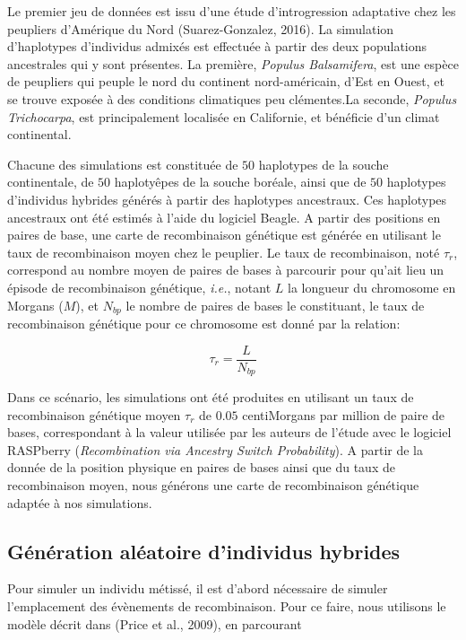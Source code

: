 \documentclass[12pt,twoside]{ugathesis}
\begin{document}
  Le premier jeu de données est issu d'une étude d'introgression
  adaptative chez les peupliers d'Amérique du Nord (Suarez-Gonzalez,
  2016). La simulation d'haplotypes d'individus admixés est effectuée à
  partir des deux populations ancestrales qui y sont présentes. La
  première, \emph{Populus Balsamifera}, est une espèce de peupliers qui
  peuple le nord du continent nord-américain, d'Est en Ouest, et se trouve
  exposée à des conditions climatiques peu clémentes.La seconde,
  \emph{Populus Trichocarpa}, est principalement localisée en Californie,
  et bénéficie d'un climat continental.
  
  Chacune des simulations est constituée de \(50\) haplotypes de la souche
  continentale, de \(50\) haplotyêpes de la souche boréale, ainsi que de
  \(50\) haplotypes d'individus hybrides générés à partir des haplotypes
  ancestraux. Ces haplotypes ancestraux ont été estimés à l'aide du
  logiciel Beagle. A partir des positions en paires de base, une carte de
  recombinaison génétique est générée en utilisant le taux de
  recombinaison moyen chez le peuplier. Le taux de recombinaison, noté
  \(\tau_r\), correspond au nombre moyen de paires de bases à parcourir
  pour qu'ait lieu un épisode de recombinaison génétique, \emph{i.e.},
  notant \(L\) la longueur du chromosome en Morgans (\(M\)), et \(N_{bp}\)
  le nombre de paires de bases le constituant, le taux de recombinaison
  génétique pour ce chromosome est donné par la relation:
  
  \[\tau_r = \frac{L}{N_{bp}}\]
  
  Dans ce scénario, les simulations ont été produites en utilisant un taux
  de recombinaison génétique moyen \(\tau_r\) de \(0.05\) centiMorgans par
  million de paire de bases, correspondant à la valeur utilisée par les
  auteurs de l'étude avec le logiciel RASPberry
  (\textit{Recombination via Ancestry Switch Probability}). A partir de la
  donnée de la position physique en paires de bases ainsi que du taux de
  recombinaison moyen, nous générons une carte de recombinaison génétique
  adaptée à nos simulations.
  
  \subsection{Génération aléatoire d'individus
  hybrides}\label{generation-aleatoire-dindividus-hybrides}
  
  Pour simuler un individu métissé, il est d'abord nécessaire de simuler
  l'emplacement des évènements de recombinaison. Pour ce faire, nous
  utilisons le modèle décrit dans (Price et al., 2009), en parcourant
  
\end{document}
